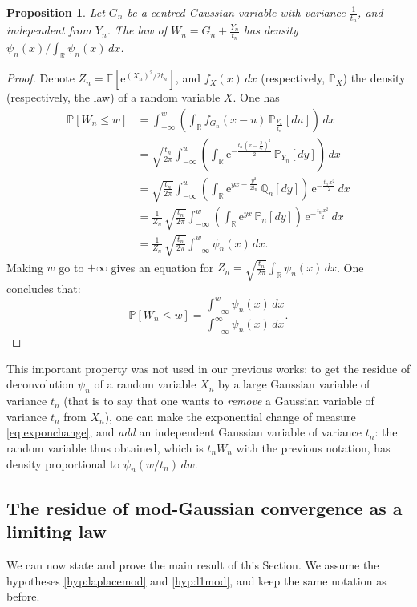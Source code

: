 \documentclass[12pt,a4paper,reqno]{amsart}
\newcommand{\R}{\mathbb{R}}
\newcommand{\E}{\mathrm{e}}
\newcommand{\esper}{\mathbb{E}}
\newcommand{\proba}{\mathbb{P}}
\newcommand{\qproba}{\mathbb{Q}}
\newtheorem{proposition}[theorem]{Proposition}
\theoremstyle{remark}
\begin{document}
\begin{proposition}\label{prop:enlemma}
Let $G_n$ be a centred Gaussian variable with variance $\frac{1}{t_n}$, and independent from $Y_n$. The law of $W_n=G_n+\frac{Y_n}{t_n}$ has density $\psi_n(x)/\int_{\R}\psi_n(x)\,dx$.
\end{proposition}

\begin{proof}
Denote $Z_n=\esper[\E^{(X_n)^2/2t_n}]$, and $f_X(x)\,dx$ (respectively, $\proba_X$) the density (respectively, the law) of a random variable $X$. One has
\begin{align*}
\proba[W_n \leq w]&= \int_{- \infty}^w \left( \int_{\R} f_{G_n}(x-u)\,\proba_{\frac{Y_n}{t_n}}[du]\right)\,dx\\
&=\sqrt{\frac{t_n}{2\pi}}\int_{- \infty}^w \left( \int_{\R} \E^{-\frac{t_n\,(x-\frac{y}{t_n})^2}{2}}\,\proba_{Y_n}[dy]\right)\,dx\\
&=\sqrt{\frac{t_n}{2\pi}}\int_{- \infty}^w \left( \int_{\R} \E^{yx-\frac{y^2}{2t_n}}\,\qproba_{n}[dy]\right)\,\E^{-\frac{t_n\,x^2}{2}}\,dx\\
&=\frac{1}{Z_n}\,\sqrt{\frac{t_n}{2\pi}}\int_{- \infty}^w \left( \int_{\R} \E^{yx}\,\proba_{n}[dy]\right)\,\E^{-\frac{t_n\,x^2}{2}}\,dx\\
&=\frac{1}{Z_n}\,\sqrt{\frac{t_n}{2\pi}}\int_{- \infty}^w \psi_n(x)\,dx.
\end{align*}
Making $w$ go to $+\infty$ gives an equation for $Z_n=\sqrt{\frac{t_n}{2\pi}}\int_{\R} \psi_n(x)\,dx$. One concludes that:
$$\proba[W_n \leq w] = \frac{\int_{-\infty}^w \psi_n(x)\,dx}{\int_{-\infty}^\infty \psi_n(x)\,dx}.$$
\end{proof}
This important property was not used in our previous works: to get the residue of deconvolution $\psi_n$ of a random variable $X_n$ by a large Gaussian variable of variance $t_n$ (that is to say that one wants to \emph{remove} a Gaussian variable of variance $t_n$ from $X_n$), one can make the exponential change of measure \eqref{eq:exponchange}, and \emph{add} an independent Gaussian variable of variance $t_n$: the random variable thus obtained, which is $t_nW_n$ with the previous notation, has density proportional to $\psi_n(w/t_n)\,dw$.
\medskip



\subsection{The residue of mod-Gaussian convergence as a limiting law}
We can now state and prove the main result of this Section. We assume the hypotheses \eqref{hyp:laplacemod} and \eqref{hyp:l1mod}, and keep the same notation as before.
\end{document}
